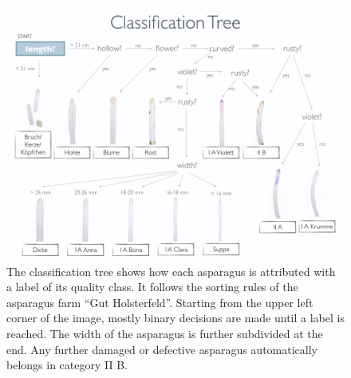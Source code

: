 \begin{figure}[h]
	\centering
	\includegraphics[scale=0.35]{Figures/chapter01/fig_tree_with_title}
	\decoRule
	\caption[Asparagus classification tree]{The classification tree shows how each asparagus is attributed with a label of its quality class. It follows the sorting rules of the asparagus farm “Gut Holsterfeld”. Starting from the upper left corner of the image, mostly binary decisions are made until a label is reached. The width of the asparagus is further subdivided at the end. Any further damaged or defective asparagus automatically belongs in category II B.}
	\label{fig:LabelTree}
\end{figure}

